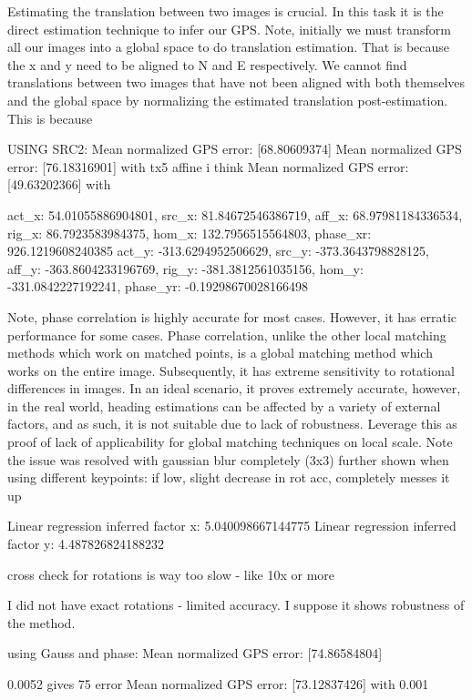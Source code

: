 Estimating the translation between two images is crucial. In this task it is the direct estimation technique to infer our GPS. Note, initially we must transform all our images into a global space to do translation estimation. That is because the x and y need to be aligned to N and E respectively. We cannot find translations between two images that have not been aligned with both themselves and the global space by normalizing the estimated translation post-estimation. This is because 

USING SRC2: Mean normalized GPS error: [68.80609374]
Mean normalized GPS error: [76.18316901]  with tx5 affine i think
Mean normalized GPS error: [49.63202366] with 


act_x: 54.01055886904801, src_x: 81.84672546386719, aff_x: 68.97981184336534, rig_x: 86.7923583984375, hom_x: 132.7956515564803, phase_xr: 926.1219608240385
act_y: -313.6294952506629, src_y: -373.3643798828125, aff_y: -363.8604233196769, rig_y: -381.3812561035156, hom_y: -331.0842227192241, phase_yr: -0.19298670028166498

Note, phase correlation is highly accurate for most cases. However, it has erratic performance for some cases. Phase correlation, unlike the other local matching methods which work on matched points, is a global matching method which works on the entire image. Subsequently, it has extreme sensitivity to rotational differences in images. In an ideal scenario, it proves extremely accurate, however, in the real world, heading estimations can be affected by a variety of external factors, and as such, it is not suitable due to lack of robustness.
Leverage this as proof of lack of applicability for global matching techniques on local scale. 
Note the issue was resolved with gaussian blur completely (3x3)
further shown when using different keypoints: if low, slight decrease in rot acc, completely messes it up

Linear regression inferred factor x: 5.040098667144775
Linear regression inferred factor y: 4.487826824188232








cross check for rotations is way too slow - like 10x or more
    
I did not have exact rotations - limited accuracy. I suppose it shows robustness of the method.


using Gauss and phase: Mean normalized GPS error: [74.86584804]


0.0052 gives 75 error 
Mean normalized GPS error: [73.12837426] with 0.001


